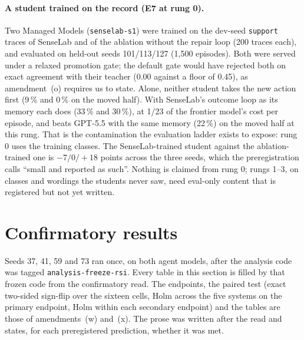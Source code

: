 \documentclass[11pt]{article}
\newcommand{\code}[1]{\texttt{#1}}
\begin{document}
\paragraph{A student trained on the record (E7 at rung 0).} Two Managed Models
(\code{senselab-s1}) were trained on the dev-seed \code{support} traces of SenseLab and of the
ablation without the repair loop (200 traces each), and evaluated on held-out seeds 101/113/127
(1,500 episodes). Both were served under a relaxed promotion gate; the default gate would have
rejected both on exact agreement with their teacher (0.00 against a floor of 0.45), as
amendment~(o) requires us to state. Alone, neither student takes the new action first (9\,\% and 0\,\% on the moved
half). With SenseLab's outcome loop as its memory each does (33\,\% and 30\,\%), at 1/23 of the
frontier model's cost per episode, and beats GPT-5.5 with the same memory (22\,\%) on the moved
half at this rung. That is the contamination the evaluation ladder exists to expose: rung 0 uses
the training classes. The SenseLab-trained student against the ablation-trained one is
$-7/0/+18$ points across the three seeds, which the preregistration calls ``small and reported as
such''. Nothing is claimed from rung 0; rungs 1--3, on classes and wordings the students never
saw, need eval-only content that is registered but not yet written.

\section{Confirmatory results}
\label{sec:confirmatory}

Seeds 37, 41, 59 and 73 ran once, on both agent models, after the analysis code was tagged
\code{analysis-freeze-rsi}. Every table in this section is filled by that frozen code from the
confirmatory read. The endpoints, the paired test (exact two-sided sign-flip over the sixteen
cells, Holm across the five systems on the primary endpoint, Holm within each secondary endpoint)
and the tables are those of amendments~(w) and~(x). The prose was written after the read and
states, for each preregistered prediction, whether it was met.
\end{document}
